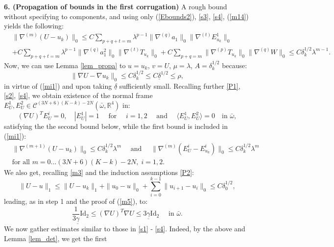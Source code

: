 \documentclass[reqno,twoside,11pt]{amsart}
\newcommand{\Id}{\mathrm{Id}}
\newcommand{\R}{\mathbb{R}}
\numberwithin{equation}{section}
\theoremstyle{plain}
\theoremstyle{definition}
\begin{document}
{\bf 6. (Propagation of bounds in the first corrugation)} A rough
bound without specifying to components, and using only
(\ref{Ebounds2}), \ref{s3}, \ref{s4}, (\ref{m14}) yields the following: 
\begin{equation}\label{mi1}
\begin{split} 
& \|\nabla^{(m)} (U-u_k)\|_0\leq C\sum_{p+q+t=m}\lambda^{p-1}
\|\nabla^{(q)}a_1\|_0\|\nabla^{(t)}E^1_{u_k}\|_0  \\ & +  C\sum_{p+q+t=m}\lambda^{p-1}
\|\nabla^{(q)}a_1^2\|_0\|\nabla^{(t)}T_{u_k}\|_0 + C\sum_{p+q=m}
\|\nabla^{(p)}T_{u_k}\|_0 \|\nabla^{(q)}W\|_0 \leq C \delta_k^{1/2}\lambda^{m-1}.
\end{split}
\end{equation}
Now, we can use Lemma \ref{lem_propa} to $u=u_k$, $v=U$, $\mu=\lambda$,
$A=\delta_k^{1/2}$ because: 
$$\|\nabla
U-\nabla u_k\|_0\leq C\delta_k^{1/2}\leq C{\underline\delta}^{1/2}\leq \rho,$$
 in virtue of (\ref{mi1}) and upon taking $\underline\delta$ sufficiently small. Recalling
further \ref{P1}, \ref{s2}, \ref{s4}, we obtain existence of the normal frame $E^1_U,
E^2_U\in\mathcal{C}^{(3N+6)(K-k)-2N}(\bar\omega, \R^4)$ in:
$$(\nabla U)^TE^i_{U}=0,\quad |E^1_U|=1\quad\mbox{ for }\quad 
i=1,2\quad\mbox{ and } \quad \langle E^1_U, E^2_U\rangle=0\quad\mbox{in } \bar\omega,$$
satisfying the the second bound below, while the first bound is
included in (\ref{mi1}):
\begin{equation}\label{n1}
\begin{split}
& \|\nabla^{(m+1)}(U-u_k)\|_0\leq C\delta_k^{1/2}\lambda^{m}\quad 
\mbox{ and }\quad \|\nabla^{(m)}(E^i_U-E^i_{u_k})\|_0\leq C\delta_k^{1/2}\lambda^{m}
\\ & \mbox{for all } m=0\ldots (3N+6)(K-k)-2N,\; i=1,2.
\end{split}
\end{equation}
We also get, recalling \ref{m3} and the induction assumptions \ref{P2}:
\begin{equation}\label{m3UU}
\|U-u\|_1\leq \|U-u_k\|_1 + \|u_0-u\|_0 + \sum_{i=0}^{k-1}\|u_{i+1}-u_i\|_0 \leq C\delta_0^{1/2},
\end{equation}
leading, as in step 1 and the proof of (\ref{m5}), to:
\begin{equation}\label{n2}
\frac{1}{3\underline\gamma}\Id_2\leq (\nabla U)^T\nabla U\leq
3\underline\gamma\Id_2 \quad\mbox{ in } \bar\omega.
\end{equation}
We now gather estimates similar to those in \ref{s1} -
\ref{s4}. Indeed, by the above and Lemma \ref{lem_det}, we get the first 
\end{document}
